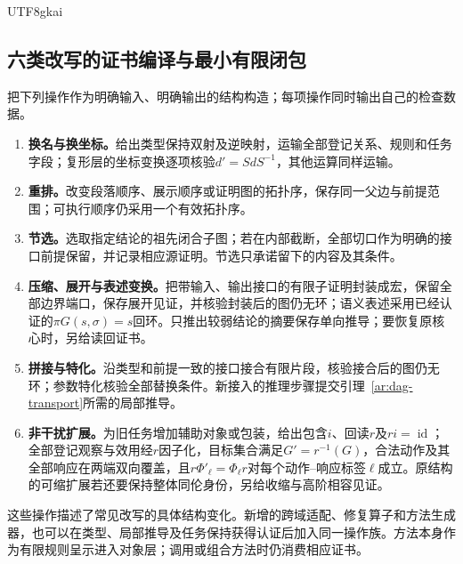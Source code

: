 \documentclass[11pt,a4paper]{article}
\theoremstyle{plain}
\theoremstyle{definition}
\theoremstyle{remark}
\begin{document}
\begin{CJK*}{UTF8}{gkai}
\subsection{六类改写的证书编译与最小有限闭包}
\label{ar:closure}

把下列操作作为明确输入、明确输出的结构构造；每项操作同时输出自己的检查数据。
\begin{enumerate}[label=\arabic*.]
\item \textbf{换名与换坐标。}给出类型保持双射及逆映射，运输全部登记关系、规则和任务字段；复形层的坐标变换逐项核验$d'=SdS^{-1}$，其他运算同样运输。
\item \textbf{重排。}改变段落顺序、展示顺序或证明图的拓扑序，保存同一父边与前提范围；可执行顺序仍采用一个有效拓扑序。
\item \textbf{节选。}选取指定结论的祖先闭合子图；若在内部截断，全部切口作为明确的接口前提保留，并记录相应源证明。节选只承诺留下的内容及其条件。
\item \textbf{压缩、展开与表述变换。}把带输入、输出接口的有限子证明封装成宏，保留全部边界端口，保存展开见证，并核验封装后的图仍无环；语义表述采用已经认证的$\pi G(s,\sigma)=s$回环。只推出较弱结论的摘要保存单向推导；要恢复原核心时，另给读回证书。
\item \textbf{拼接与特化。}沿类型和前提一致的接口接合有限片段，核验接合后的图仍无环；参数特化核验全部替换条件。新接入的推理步骤提交引理~\ref{ar:dag-transport}所需的局部推导。
\item \textbf{非干扰扩展。}为旧任务增加辅助对象或包装，给出包含$i$、回读$r$及$ri=\operatorname{id}$；全部登记观察与效用经$r$因子化，目标集合满足$G'=r^{-1}(G)$，合法动作及其全部响应在两端双向覆盖，且$r\Phi'_\ell=\Phi_\ell r$对每个动作--响应标签$\ell$成立。原结构的可缩扩展若还要保持整体同伦身份，另给收缩与高阶相容见证。
\end{enumerate}
这些操作描述了常见改写的具体结构变化。新增的跨域适配、修复算子和方法生成器，也可以在类型、局部推导及任务保持获得认证后加入同一操作族。方法本身作为有限规则呈示进入对象层；调用或组合方法时仍消费相应证书。\cite{S04,S09,S10,S12,S13,S38}


\end{CJK*}
\end{document}
